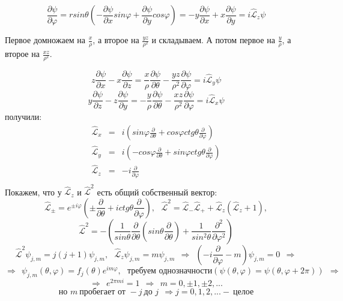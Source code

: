 	$$
		\frac{\partial\psi}{\partial\varphi} = rsin\theta\left(-\frac{\partial\psi}{\partial x}sin\varphi + \frac{\partial\psi}{\partial y}cos\varphi\right) = -y\frac{\partial\psi}{\partial x} + x \frac{\partial\psi}{\partial y} = i\hat{\mathcal{L}}_z\psi 
	$$
	\begin{tiny}Первое домножаем на $\frac{x}{\rho}$, а второе на $\frac{yz}{\rho^2}$ и складываем. А потом первое на $\frac{y}{\rho}$, а второе на $\frac{xz}{\rho^2}$.\end{tiny}
	$$
		z\frac{\partial\psi}{\partial x}-x\frac{\partial\psi}{\partial z} = \frac{x}{\rho}\frac{\partial\psi}{\partial\theta} - \frac{yz}{\rho^2}\frac{\partial\psi}{\partial\varphi} = i\hat{\mathcal{L}}_y\psi
	$$
	$$
		y\frac{\partial\psi}{\partial z} - z\frac{\partial\psi}{\partial y} = -\frac{y}{\rho}\frac{\partial\psi}{\partial\theta} - \frac{xz}{\rho^2}\frac{\partial\psi}{\partial\varphi} = i\hat{\mathcal{L}}_x\psi
	$$
	получили:
	$$
		\begin{array}{lcl}
			\hat{\mathcal{L}}_x & = & i\left(sin\varphi\frac{\partial}{\partial\theta} + cos\varphi ctg\theta\frac{\partial}{\partial\varphi}\right) \\
			\hat{\mathcal{L}}_y & = & i\left(-cos\varphi\frac{\partial}{\partial\theta} + sin\varphi ctg\theta\frac{\partial}{\partial\varphi}\right) \\
			\hat{\mathcal{L}}_z & = & -i\frac{\partial}{\partial\varphi} \\
		\end{array}
	$$
	Покажем, что у $\hat{\mathcal{L}}_z$ и $\hat{\mathcal{L}}^2$ есть общий собственный вектор:
	$$
		\hat{\mathcal{L}}_{\pm} = e^{\pm i\varphi}\left(\pm\frac{\partial}{\partial\theta} + ictg\theta\frac{\partial}{\partial\varphi}\right), \ \ \ \hat{\mathcal{L}}^2 = \hat{\mathcal{L}}_{-}\hat{\mathcal{L}}_{+}+\hat{\mathcal{L}}_z(\hat{\mathcal{L}}_z + 1),
	$$
	$$
		 \hat{\mathcal{L}}^2 = -\left(\frac{1}{sin\theta}\frac{\partial}{\partial\theta}\left(sin\theta\frac{\partial}{\partial\theta}\right) + \frac{1}{sin^2\theta}\frac{\partial^2}{\partial\varphi^2}\right)
	$$
	$$
		\hat{\mathcal{L}}^2\psi_{j,m} = j(j + 1)\psi_{j,m}, \ \ \ \hat{\mathcal{L}}_z\psi_{j,m} = m\psi_{j,m} \ \ \Rightarrow \ \ \left(-i\frac{\partial}{\partial\varphi} - m\right)\psi_{j,m} = 0 \ \ \Rightarrow 
	$$
	$$
		\Rightarrow \ \  \psi_{j,m}(\theta,\varphi) = f_j(\theta)e^{im\varphi}, \ \ \ \text{требуем однозначности}(\psi(\theta,\varphi) = \psi(\theta, \varphi+2\pi)) \ \ \Rightarrow
	$$
	$$
		\Rightarrow \ \ e^{2\pi mi} = 1 \ \ \Rightarrow \ \ m = 0, \pm1, \pm2, ...
	$$
	$$
		\text{но } m \ \text{пробегает от } -j \ \text{до } j \ \ \Rightarrow j = 0, 1, 2, ... - \ \text{целое} 
	$$
